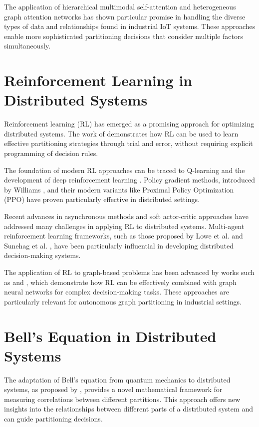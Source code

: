 The application of hierarchical multimodal self-attention \cite{ji2024hierarchical} and heterogeneous graph attention networks \cite{wang2019heterogeneous} has shown particular promise in handling the diverse types of data and relationships found in industrial IoT systems. These approaches enable more sophisticated partitioning decisions that consider multiple factors simultaneously.

\section{Reinforcement Learning in Distributed Systems}
Reinforcement learning (RL) has emerged as a promising approach for optimizing distributed systems. The work of \cite{rl2023} demonstrates how RL can be used to learn effective partitioning strategies through trial and error, without requiring explicit programming of decision rules.

The foundation of modern RL approaches can be traced to Q-learning \cite{watkins1992q} and the development of deep reinforcement learning \cite{mnih2015human}. Policy gradient methods, introduced by Williams \cite{williams1992simple}, and their modern variants like Proximal Policy Optimization (PPO) \cite{schulman2017proximal} have proven particularly effective in distributed settings.

Recent advances in asynchronous methods \cite{mnih2016asynchronous} and soft actor-critic approaches \cite{haarnoja2018soft} have addressed many challenges in applying RL to distributed systems. Multi-agent reinforcement learning frameworks, such as those proposed by Lowe et al. \cite{lowe2017multi} and Sunehag et al. \cite{sunehag2018value}, have been particularly influential in developing distributed decision-making systems.

The application of RL to graph-based problems has been advanced by works such as \cite{you2018graph} and \cite{jiang2018graph}, which demonstrate how RL can be effectively combined with graph neural networks for complex decision-making tasks. These approaches are particularly relevant for autonomous graph partitioning in industrial settings.

\section{Bell's Equation in Distributed Systems}
The adaptation of Bell's equation from quantum mechanics to distributed systems, as proposed by \cite{bell2023}, provides a novel mathematical framework for measuring correlations between different partitions. This approach offers new insights into the relationships between different parts of a distributed system and can guide partitioning decisions.

